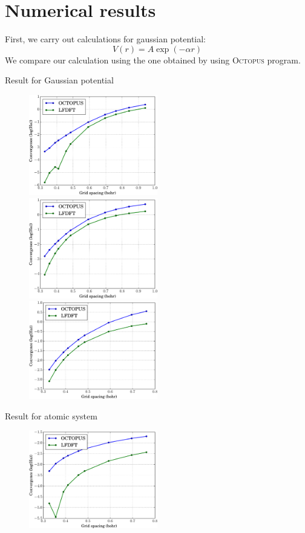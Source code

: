 \section{Numerical results}

First, we carry out calculations for gaussian potential:
\begin{equation}
V(r) = A\exp(-\alpha r)
\end{equation}
We compare our calculation using the one obtained by using \textsf{\textsc{Octopus}} program.

Result for Gaussian potential
\begin{figure}[h]
\includegraphics[width=0.5\textwidth]{images/CONV_A_10_alpha_1.pdf}
\includegraphics[width=0.5\textwidth]{images/CONV_A_10_alpha_2.pdf}
\includegraphics[width=0.5\textwidth]{images/CONV_A_10_alpha_3.pdf}
\end{figure}

Result for atomic system
\begin{figure}[h]
\includegraphics[width=0.5\textwidth]{images/CONV_atom_H.pdf}
\end{figure}

